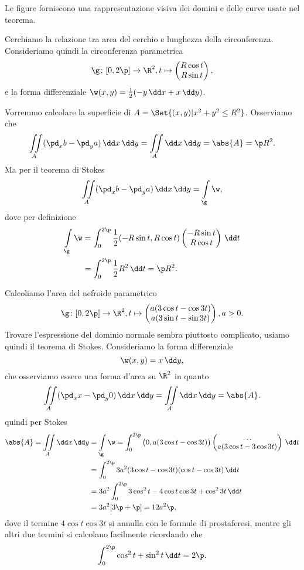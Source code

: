 \begin{oss}
	Le figure %
	forniscono una rappresentazione visiva dei domini e delle curve usate nel teorema.
\end{oss}

\begin{ese}
	Cerchiamo la relazione tra area del cerchio e lunghezza della circonferenza.
	Consideriamo quindi la circonferenza parametrica
	\[
		\g\colon [0,2\p] \to \R^2, t \mapsto \begin{pmatrix}R\cos t\\ R\sin t\end{pmatrix},
	\]
	e la forma differenziale \(\w(x,y) = \frac{1}{2}(-y\,\dd x + x\,\dd y)\).

	Vorremmo calcolare la superficie di \(A=\Set{(x,y) | x^2+y^2 \le R^2}\).
	Osserviamo che
	\[
		\iint\limits_A (\pd_x b - \pd_y a)\,\dd x\,\dd y = \iint\limits_A \dd x\,\dd y = \abs{A} = \p R^2.
	\]
	Ma per il teorema di Stokes
	\[
		\iint\limits_A (\pd_x b - \pd_y a)\,\dd x\,\dd y = \int\limits_\g \w,
	\]
	dove per definizione
	\[
		\begin{split}
			\int\limits_\g \w & = \int_0^{2\p} \frac{1}{2}(-R\sin t,R \cos t)\begin{pmatrix}-R\sin t\\R \cos t\end{pmatrix}\,\dd t\\
			& = \int_0^{2\p}\frac{1}{2}R^2\,\dd t = \p R^2.
		\end{split}
	\]
\end{ese}

\begin{ese}
	Calcoliamo l'area del nefroide parametrico
	\[
		\g\colon [0,2\p]\to \R^2, t \mapsto \begin{pmatrix}
			a(3\cos t-\cos 3t) \\
			a(3\sin t-\sin 3t)
		\end{pmatrix},a>0.
	\]
	Trovare l'espressione del dominio normale sembra piuttosto complicato, usiamo quindi il teorema di Stokes.
	Consideriamo la forma differenziale
	\[
		\w(x,y) = x\,\dd y,
	\]
	che osserviamo essere una forma d'area su \(\R^2\) in quanto
	\[
		\iint\limits_A (\pd_x x-\pd_y 0)\,\dd x\,\dd y = \iint\limits_A \dd x\,\dd y = \abs{A}.
	\]
	quindi per Stokes
	\[
		\begin{split}
			\abs{A} = \iint\limits_A \dd x\,\dd y & = \int\limits_\g \w = \int_0^{2\p} \big(0,a(3\cos t-\cos 3t)\big) \begin{pmatrix}\dots\\ a(3\cos t-3\cos 3t)\end{pmatrix}\, \dd t\\
			& = \int_0^{2\p} 3a^2 (3\cos t-\cos 3t)(\cos t-\cos 3t)\,\dd t\\
			& = 3a^2 \int_0^{2\p} 3\cos^2 t-4\cos t\cos 3t + \cos^2 3t\,\dd t\\
			& = 3a^2 [3\p+\p] = 12a^2\p,
		\end{split}
	\]
	dove il termine \(4\cos t\cos 3t\) si annulla con le formule di prostaferesi, mentre gli altri due termini si calcolano facilmente ricordando che
	\[
		\int_0^{2\p}\cos^2 t +\sin^2 t \,\dd t = 2\p.
	\]
\end{ese}
